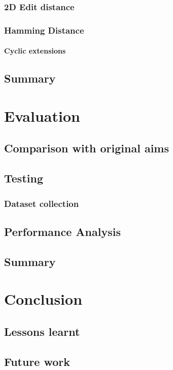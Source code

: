 \documentclass[12pt,twoside,notitlepage]{report}
\begin{document}
		\subsection{2D Edit distance}
		
		\subsection{Hamming Distance}
		
		\subsubsection{Cyclic extensions}
			
	\section{Summary}
	

\cleardoublepage
\chapter{Evaluation}
	\section{Comparison with original aims}
	\section{Testing}
		\subsection{Dataset collection}
	\section{Performance Analysis}
	\section{Summary}
	
\cleardoublepage
\chapter{Conclusion}
	\section{Lessons learnt}
	\section{Future work}
\end{document}
